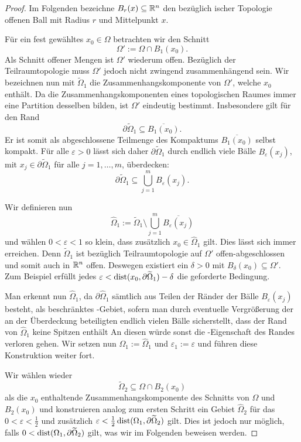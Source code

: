\begin{proof}
Im Folgenden bezeichne $B_r(x) \subseteq \mathbb{R}^n$ den bezüglich \euklid ischer Topologie offenen Ball mit Radius $r$ und Mittelpunkt $x$.

  Für ein fest gewähltes $x_0 \in \Omega$ betrachten wir den Schnitt 
  $$
  \Omega' := \Omega \cap B_1(x_0).
  $$ 
  Als Schnitt offener Mengen ist $\Omega'$ wiederum offen. 
  Bezüglich der Teilraumtopologie muss $\Omega'$ jedoch nicht zwingend zusammenhängend sein.
  Wir bezeichnen nun mit $\widetilde\Omega_1$ die Zusammenhangskomponente von $\Omega'$, welche $x_0$ enthält.
  Da die Zusammenhangskomponenten eines topologischen Raumes immer eine Partition desselben bilden, ist $\Omega'$ eindeutig bestimmt.
  Insbesondere gilt für den Rand
  $$ 
  \partial \widetilde\Omega_1 \subseteq \overline{B_1(x_0)}.
  $$
  Er ist somit als abgeschlossene Teilmenge des Kompaktums $\overline{B_1(x_0)}$ selbst kompakt.
  Für alle $\varepsilon > 0$ lässt sich daher $\partial \widetilde\Omega_1$ durch endlich viele Bälle $B_\varepsilon(x_j)$, mit $x_j \in \partial \widetilde\Omega_1$ für alle $j = 1,\dots,m$, überdecken:
  $$ 
  \partial \widetilde\Omega_1 \subseteq \bigcup_{j = 1}^m B_\varepsilon(x_j).
  $$

  Wir definieren nun 
  $$
  \widehat\Omega_1 := \widetilde\Omega_1 \setminus \bigcup_{j = 1}^m \overline{B_\varepsilon(x_j)}
  $$
  und wählen $0 < \varepsilon < 1$ so klein, dass zusätzlich $x_0 \in \widehat\Omega_1$ gilt. 
  Dies lässt sich immer erreichen. 
  Denn $\widetilde\Omega_1$ ist bezüglich Teilraumtopologie auf $\Omega'$ offen-abgeschlossen und somit auch in $\mathbb{R}^n$ offen.
  Deswegen existiert ein $\delta > 0$ mit $B_\delta(x_0) \subseteq \Omega'$.
  Zum Beispiel erfüllt jedes $\varepsilon < \operatorname{dist}(x_0, \partial\widetilde\Omega_1) - \delta$ die geforderte Bedingung.

  Man erkennt nun $\widehat\Omega_1$, da $\partial\widehat\Omega_1$ sämtlich aus Teilen der Ränder der Bälle $B_\varepsilon(x_j)$ besteht, als beschränktes \lipschitz\hyp{}Gebiet, sofern man durch eventuelle Vergrößerung der an der Überdeckung beteiligten endlich vielen Bälle sicherstellt, dass der Rand von $\widehat\Omega_1$ keine Spitzen enthält
  An diesen würde sonst die \lipschitz\hyp{}Eigenschaft des Randes verloren gehen.
  Wir setzen nun $\Omega_1 := \widehat\Omega_1$ und $\varepsilon_1 := \varepsilon$ und führen diese Konstruktion weiter fort.

  Wir wählen wieder 
  $$
  \widetilde\Omega_2 \subseteq \Omega \cap B_2(x_0)
  $$
  als die $x_0$ enthaltende Zusammenhangskomponente des Schnitts von $\Omega$ und $B_2(x_0)$ und konstruieren analog zum ersten Schritt ein Gebiet $\widehat\Omega_2$ für das $0 < \varepsilon < \tfrac{1}{2}$ und zusätzlich $\varepsilon < \tfrac{1}{2}\operatorname{dist}(\Omega_1, \partial\widetilde\Omega_2)$ gilt.
  Dies ist jedoch nur möglich, falls $0 < \operatorname{dist}(\Omega_1, \partial\widetilde\Omega_2)$ gilt, was wir im Folgenden beweisen werden.


\end{proof}
